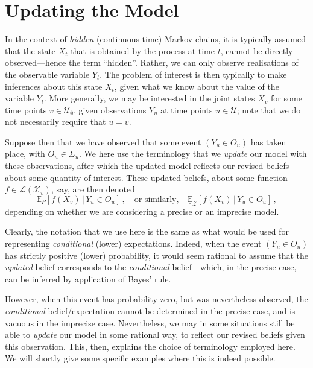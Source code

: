 \documentclass[twoside,11pt]{article}
\newcommand{\states}{\mathcal{X}}
\newcommand{\gambles}{\mathcal{L}}
\begin{document}
\section{Updating the Model}\label{sec:updating_model}

In the context of \emph{hidden} (continuous-time) Markov chains, it is typically assumed that the state $X_t$ that is obtained by the process at time $t$, cannot be directly observed---hence the term ``hidden''. Rather, we can only observe realisations of the observable variable $Y_t$. The problem of interest is then typically to make inferences about this state $X_t$, given what we know about the value of the variable $Y_t$. More generally, we may be interested in the joint states $X_v$ for some time points $v\in\mathcal{U}_\emptyset$, given observations $Y_u$ at time points $u\in\mathcal{U}$; note that we do not necessarily require that $u=v$.

Suppose then that we have observed that some event $(Y_u\in O_u)$ has taken place, with $O_u\in\Sigma_u$. We here use the terminology that we \emph{update} our model with these observations, after which the updated model reflects our revised beliefs about some quantity of interest. These updated beliefs, about some function $f\in\gambles(\states_v)$, say, are then denoted
\begin{equation*}
\mathbb{E}_P[f(X_v)\,\vert\,Y_u\in O_u]\,,\quad\text{or similarly,}\quad\underline{\mathbb{E}}_\mathcal{Z}[f(X_v)\,\vert\,Y_u\in O_u]\,,
\end{equation*}
depending on whether we are considering a precise or an imprecise model.

Clearly, the notation that we use here is the same as what would be used for representing \emph{conditional} (lower) expectations. Indeed, when the event $(Y_u\in O_u)$ has strictly positive (lower) probability, it would seem rational to assume that the \emph{updated} belief corresponds to the \emph{conditional} belief---which, in the precise case, can be inferred by application of Bayes' rule. 

However, when this event has probability zero, but was nevertheless observed, the \emph{conditional} belief/expectation cannot be determined in the precise case, and is vacuous in the imprecise case. Nevertheless, we may in some situations still be able to \emph{update} our model in some rational way, to reflect our revised beliefs given this observation. This, then, explains the choice of terminology employed here. We will shortly give some specific examples where this is indeed possible.
\end{document}
